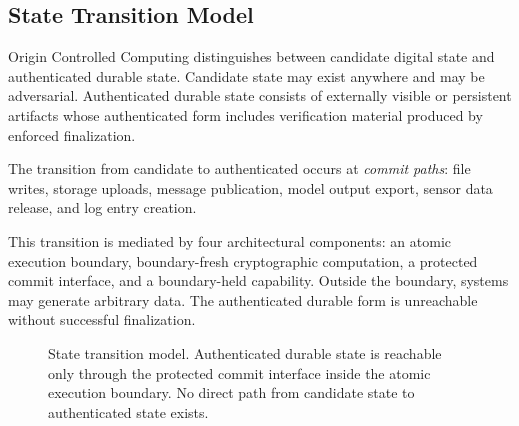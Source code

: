 \documentclass[11pt,letterpaper]{article}
\theoremstyle{occplain}
\theoremstyle{occremark}
\begin{document}
\subsection{State Transition Model}
\label{sec:state-transition}

Origin Controlled Computing distinguishes between candidate digital state and authenticated durable state. Candidate state may exist anywhere and may be adversarial. Authenticated durable state consists of externally visible or persistent artifacts whose authenticated form includes verification material produced by enforced finalization.

The transition from candidate to authenticated occurs at \emph{commit paths}: file writes, storage uploads, message publication, model output export, sensor data release, and log entry creation.

This transition is mediated by four architectural components: an atomic execution boundary, boundary-fresh cryptographic computation, a protected commit interface, and a boundary-held capability. Outside the boundary, systems may generate arbitrary data. The authenticated durable form is unreachable without successful finalization.

\begin{figure}[htbp]
\centering
{}
\caption{State transition model. Authenticated durable state is reachable only through the protected commit interface inside the atomic execution boundary. No direct path from candidate state to authenticated state exists.}
\label{fig:state-transition}
\end{figure}
\end{document}
